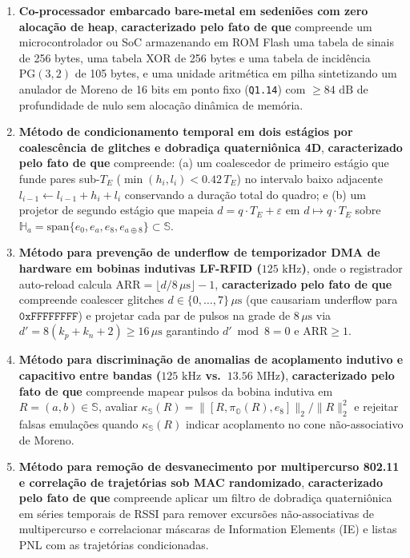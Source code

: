 \documentclass[12pt,a4paper]{article}
\begin{document}
\begin{enumerate}[leftmargin=20pt,itemsep=4pt]
    \item \textbf{Co-processador embarcado bare-metal em sedeni\~oes com zero aloca\c{c}\~ao de heap}, \textbf{caracterizado pelo fato de que} compreende um microcontrolador ou SoC armazenando em ROM Flash uma tabela de sinais de 256 bytes, uma tabela XOR de 256 bytes e uma tabela de incid\^encia $\mathrm{PG}(3,2)$ de 105 bytes, e uma unidade aritm\'etica em pilha sintetizando um anulador de Moreno de 16 bits em ponto fixo (\texttt{Q1.14}) com $\ge 84\text{ dB}$ de profundidade de nulo sem aloca\c{c}\~ao din\^amica de mem\'oria.

    \item \textbf{M\'etodo de condicionamento temporal em dois est\'agios por coalesc\^encia de glitches e dobradi\c{c}a quaterni\^onica 4D}, \textbf{caracterizado pelo fato de que} compreende: (a) um coalescedor de primeiro est\'agio que funde pares sub-$T_E$ ($\min(h_i, l_i) < 0.42\,T_E$) no intervalo baixo adjacente $l_{i-1} \leftarrow l_{i-1} + h_i + l_i$ conservando a dura\c{c}\~ao total do quadro; e (b) um projetor de segundo est\'agio que mapeia $d = q\cdot T_E + \varepsilon$ em $d \mapsto q\cdot T_E$ sobre $\mathbb{H}_a = \mathrm{span}\{e_0, e_a, e_8, e_{a\oplus 8}\} \subset \mathbb{S}$.

    \item \textbf{M\'etodo para preven\c{c}\~ao de underflow de temporizador DMA de hardware em bobinas indutivas LF-RFID ($125\text{ kHz}$)}, onde o registrador auto-reload calcula $\mathrm{ARR} = \lfloor d / 8\,\mu\text{s} \rfloor - 1$, \textbf{caracterizado pelo fato de que} compreende coalescer glitches $d \in \{0,\dots,7\}\,\mu\text{s}$ (que causariam underflow para $\mathtt{0xFFFFFFFF}$) e projetar cada par de pulsos na grade de $8\,\mu\text{s}$ via $d' = 8(k_p + k_n + 2) \ge 16\,\mu\text{s}$ garantindo $d' \bmod 8 = 0$ e $\mathrm{ARR} \ge 1$.

    \item \textbf{M\'etodo para discrimina\c{c}\~ao de anomalias de acoplamento indutivo e capacitivo entre bandas ($125\text{ kHz}$ vs.\ $13.56\text{ MHz}$)}, \textbf{caracterizado pelo fato de que} compreende mapear pulsos da bobina indutiva em $R = (a, b) \in \mathbb{S}$, avaliar $\kappa_{\mathbb{S}}(R) = \|[R, \pi_{\mathbb{O}}(R), e_8]\|_2 / \|R\|_2^2$ e rejeitar falsas emula\c{c}\~oes quando $\kappa_{\mathbb{S}}(R)$ indicar acoplamento no cone n\~ao-associativo de Moreno.

    \item \textbf{M\'etodo para remo\c{c}\~ao de desvanecimento por multipercurso 802.11 e correla\c{c}\~ao de trajet\'orias sob MAC randomizado}, \textbf{caracterizado pelo fato de que} compreende aplicar um filtro de dobradi\c{c}a quaterni\^onica em s\'eries temporais de RSSI para remover excurs\~oes n\~ao-associativas de multipercurso e correlacionar m\'ascaras de Information Elements (IE) e listas PNL com as trajet\'orias condicionadas.


\end{enumerate}
\end{document}
